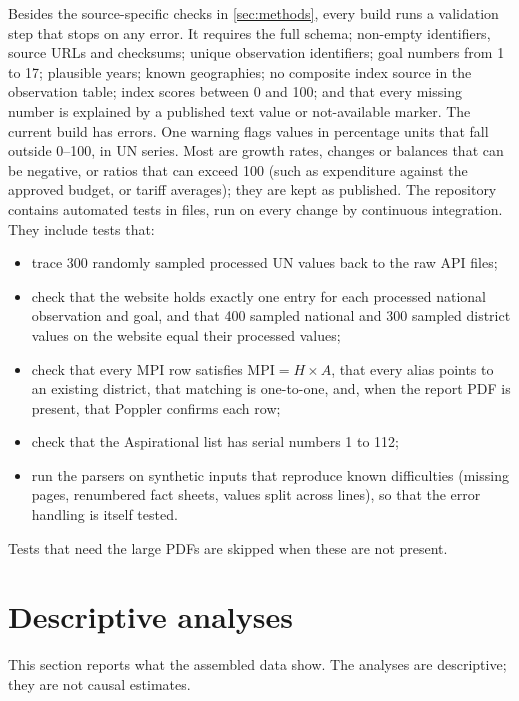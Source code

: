 \documentclass[11pt,a4paper]{article}
\begin{document}
Besides the source-specific checks in \cref{sec:methods}, every build runs a validation step that stops on any error. It requires the full schema; non-empty identifiers, source URLs and checksums; unique observation identifiers; goal numbers from 1 to 17; plausible years; known geographies; no composite index source in the observation table; index scores between 0 and 100; and that every missing number is explained by a published text value or not-available marker. The current build has \valErrors{} errors. One warning flags \pctOutside{} values in percentage units that fall outside 0--100, in \pctOutsideSeries{} UN series. Most are growth rates, changes or balances that can be negative, or ratios that can exceed 100 (such as expenditure against the approved budget, or tariff averages); they are kept as published. The repository contains \nTests{} automated tests in \nTestFiles{} files, run on every change by continuous integration. They include tests that:
\begin{itemize}
  \item trace 300 randomly sampled processed UN values back to the raw API files;
  \item check that the website holds exactly one entry for each processed national observation and goal, and that 400 sampled national and 300 sampled district values on the website equal their processed values;
  \item check that every MPI row satisfies $\mathrm{MPI} = H \times A$, that every alias points to an existing district, that matching is one-to-one, and, when the report PDF is present, that Poppler confirms each row;
  \item check that the Aspirational list has serial numbers 1 to 112;
  \item run the parsers on synthetic inputs that reproduce known difficulties (missing pages, renumbered fact sheets, values split across lines), so that the error handling is itself tested.
\end{itemize}
Tests that need the large PDFs are skipped when these are not present.

\section{Descriptive analyses}\label{sec:analysis}

This section reports what the assembled data show. The analyses are descriptive; they are not causal estimates.
\end{document}
